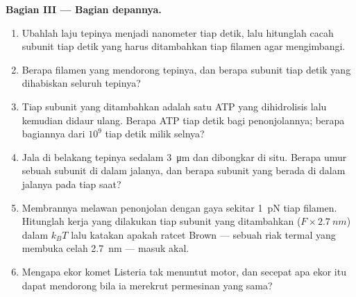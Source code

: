 \begin{problem}
\medskip
\noindent\textbf{Bagian III --- Bagian depannya.}
\begin{enumerate}[resume]
  \item Ubahlah laju tepinya menjadi nanometer tiap detik, lalu hitunglah
        cacah subunit tiap detik yang harus ditambahkan tiap filamen agar
        mengimbangi.
  \item Berapa filamen yang mendorong tepinya, dan berapa subunit tiap
        detik yang dihabiskan seluruh tepinya?
  \item Tiap subunit yang ditambahkan adalah satu ATP yang dihidrolisis lalu
        kemudian didaur ulang. Berapa ATP tiap detik bagi penonjolannya;
        berapa bagiannya dari $10^{9}$ tiap detik milik selnya?
  \item Jala di belakang tepinya sedalam \qty{3}{\micro m} dan dibongkar
        di situ. Berapa umur sebuah subunit di dalam jalanya, dan berapa
        subunit yang berada di dalam jalanya pada tiap saat?
  \item Membrannya melawan penonjolan dengan gaya sekitar
        \qty{1}{pN} tiap filamen. Hitunglah kerja yang dilakukan tiap subunit
        yang ditambahkan ($F\times \qty{2.7}{nm}$) dalam $k_{B}T$ lalu katakan
        apakah ratcet Brown --- sebuah riak termal yang membuka celah
        \qty{2.7}{nm} --- masuk akal.
  \item Mengapa ekor komet Listeria tak menuntut motor, dan secepat apa
        ekor itu dapat mendorong bila ia merekrut permesinan yang sama?
\end{enumerate}


\end{problem}
